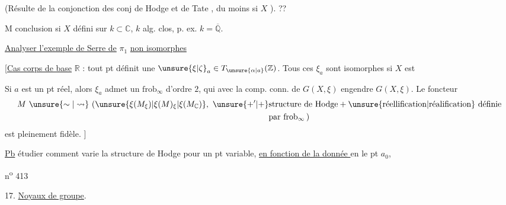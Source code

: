 (Résulte de la conjonction des conj de Hodge et de Tate  , du moins si $X$ \uline{}). \uline{} ??
\margin{$\vert\,\vert\,\vert\,\vert\,\vert$}

M conclusion si $X$ défini sur $k\subset\mathbb C$, $k$ alg. clos, p. ex. $k=\overline{\mathbb Q}$.

\begin{center}\uline{Analyser l'exemple de Serre de} $\pi_1$ \uline{non isomorphes}\end{center}

[\uline{Cas corps de base} $\mathbb R$ : tout pt   définit une $\unsure{\xi|\zeta}_a\in T_{\unsure{\alpha|a}}(\mathbb Z)$. Tous ces $\xi_a$ sont isomorphes si  $X$ est   

Si $a$ est un pt réel, alors $\xi_a$ admet un  $\mathrm{frob}_{\infty}$ d'ordre $2$, qui avec la comp. conn. de $G(X,\xi)$ engendre $G(X,\xi)$.
Le foncteur
\[
\begin{aligned}
M\ \unsure{\sim|\leadsto}\ (\unsure{\xi(M_{\xi})|\xi(M)_{\xi}|\xi(M_{\mathbb C})},\ \unsure{+^{\prime}|+}&\text{structure de Hodge}+\text{\unsure{réellification|réalification} définie}\\
&\text{par }\mathrm{frob}_{\infty}\,)
\end{aligned}
\]
est pleinement fidèle. ]

\margin{$\vert\,\vert\,\vert$}
\uline{Pb} étudier comment varie la structure de Hodge pour un pt  variable, \uline{en fonction de la donnée } en le pt $a_0$,

\hfill n\textsuperscript{o} 413

17. \uline{Noyaux de groupe}.

